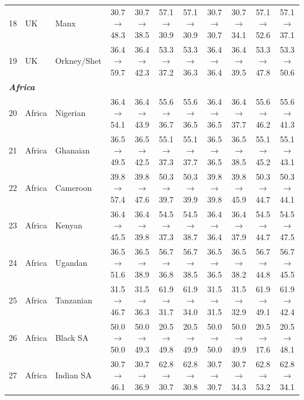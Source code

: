 \begin{table}[t]
{\begin{tabular}{rll c c c c c c c c}
18 & UK & Manx & 30.7$\rightarrow$48.3 & 30.7$\rightarrow$38.5 & 57.1$\rightarrow$30.9 & 57.1$\rightarrow$30.9 & 30.7$\rightarrow$30.7 & 30.7$\rightarrow$34.1 & 57.1$\rightarrow$52.6 & 57.1$\rightarrow$37.1 \\
19 & UK & Orkney/Shet & 36.4$\rightarrow$59.7 & 36.4$\rightarrow$42.3 & 53.3$\rightarrow$37.2 & 53.3$\rightarrow$36.3 & 36.4$\rightarrow$36.4 & 36.4$\rightarrow$39.5 & 53.3$\rightarrow$47.8 & 53.3$\rightarrow$50.6 \\
\midrule
\multicolumn{11}{l}{\textit{\textbf{Africa}}} \\
20 & Africa & Nigerian & 36.4$\rightarrow$54.1 & 36.4$\rightarrow$43.9 & 55.6$\rightarrow$36.7 & 55.6$\rightarrow$36.5 & 36.4$\rightarrow$36.5 & 36.4$\rightarrow$37.7 & 55.6$\rightarrow$46.2 & 55.6$\rightarrow$41.3 \\
21 & Africa & Ghanaian & 36.5$\rightarrow$49.5 & 36.5$\rightarrow$42.5 & 55.1$\rightarrow$37.3 & 55.1$\rightarrow$37.7 & 36.5$\rightarrow$36.5 & 36.5$\rightarrow$38.5 & 55.1$\rightarrow$45.2 & 55.1$\rightarrow$43.1 \\
22 & Africa & Cameroon & 39.8$\rightarrow$57.4 & 39.8$\rightarrow$47.6 & 50.3$\rightarrow$39.7 & 50.3$\rightarrow$39.9 & 39.8$\rightarrow$39.8 & 39.8$\rightarrow$45.9 & 50.3$\rightarrow$44.7 & 50.3$\rightarrow$44.1 \\
23 & Africa & Kenyan & 36.4$\rightarrow$45.5 & 36.4$\rightarrow$39.8 & 54.5$\rightarrow$37.3 & 54.5$\rightarrow$38.7 & 36.4$\rightarrow$36.4 & 36.4$\rightarrow$37.9 & 54.5$\rightarrow$44.7 & 54.5$\rightarrow$47.5 \\
24 & Africa & Ugandan & 36.5$\rightarrow$51.6 & 36.5$\rightarrow$38.9 & 56.7$\rightarrow$36.8 & 56.7$\rightarrow$38.5 & 36.5$\rightarrow$36.5 & 36.5$\rightarrow$38.2 & 56.7$\rightarrow$44.8 & 56.7$\rightarrow$45.5 \\
25 & Africa & Tanzanian & 31.5$\rightarrow$46.7 & 31.5$\rightarrow$36.3 & 61.9$\rightarrow$31.7 & 61.9$\rightarrow$34.0 & 31.5$\rightarrow$31.5 & 31.5$\rightarrow$32.9 & 61.9$\rightarrow$49.1 & 61.9$\rightarrow$42.4 \\
26 & Africa & Black SA & 50.0$\rightarrow$50.0 & 50.0$\rightarrow$49.3 & 20.5$\rightarrow$49.8 & 20.5$\rightarrow$49.9 & 50.0$\rightarrow$50.0 & 50.0$\rightarrow$49.9 & 20.5$\rightarrow$17.6 & 20.5$\rightarrow$48.1 \\
27 & Africa & Indian SA & 30.7$\rightarrow$46.1 & 30.7$\rightarrow$36.9 & 62.8$\rightarrow$30.7 & 62.8$\rightarrow$30.8 & 30.7$\rightarrow$30.7 & 30.7$\rightarrow$34.3 & 62.8$\rightarrow$53.2 & 62.8$\rightarrow$34.1 \\

\end{tabular}}
\end{table}
